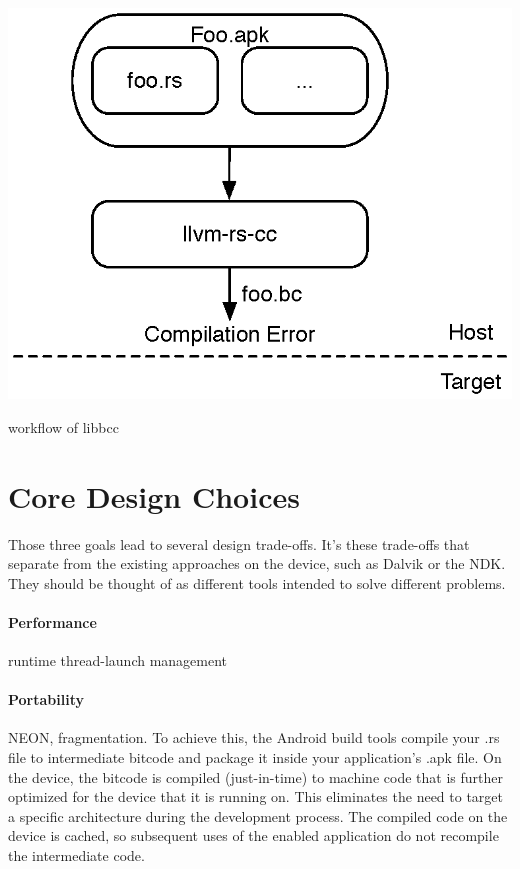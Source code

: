 \begin{center-figure}
	\includegraphics[scale=0.8]{fig/libbcc_workflow.eps}
	\caption{workflow of libbcc}
	\label{fig:workflow_libbcc}
\end{center-figure}

\section{Core Design Choices}
\label{s:DesignChoices}
Those three goals lead to several design trade-offs. It's these trade-offs that separate \RS{} from the existing approaches on the device, such as Dalvik or the NDK. They should be thought of as different tools intended to solve different problems.

\paragraph{Performance} runtime thread-launch management
\paragraph{Portability} NEON, fragmentation. To achieve this, the Android build tools compile your \RS{} .rs file to intermediate bitcode and package it inside your application's .apk file. On the device, the bitcode is compiled (just-in-time) to machine code that is further optimized for the device that it is running on. This eliminates the need to target a specific architecture during the development process. The compiled code on the device is cached, so subsequent uses of the \RS{} enabled application do not recompile the intermediate code.

